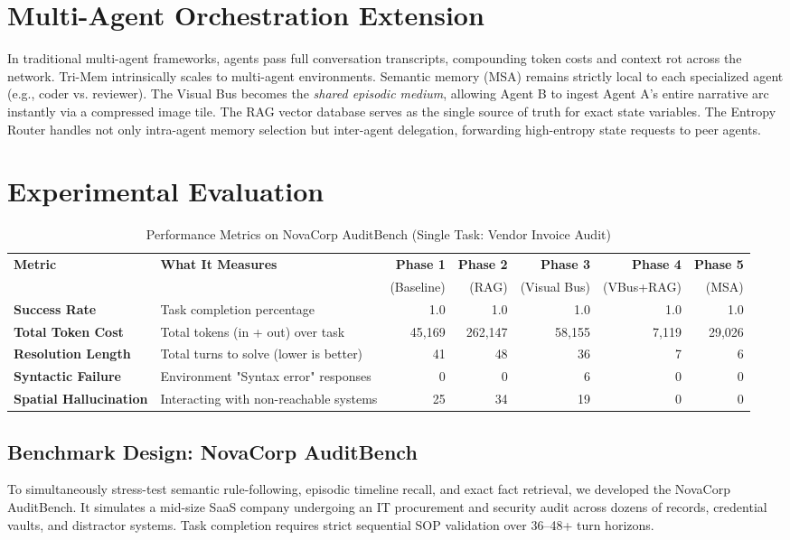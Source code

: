 \documentclass[conference]{IEEEtran}
\begin{document}
\section{Multi-Agent Orchestration Extension}
In traditional multi-agent frameworks, agents pass full conversation transcripts, compounding token costs and context rot across the network. Tri-Mem intrinsically scales to multi-agent environments. Semantic memory (MSA) remains strictly local to each specialized agent (e.g., coder vs. reviewer). The Visual Bus becomes the \textit{shared episodic medium}, allowing Agent B to ingest Agent A's entire narrative arc instantly via a compressed image tile. The RAG vector database serves as the single source of truth for exact state variables. The Entropy Router handles not only intra-agent memory selection but inter-agent delegation, forwarding high-entropy state requests to peer agents.

\section{Experimental Evaluation}

\begin{table}[!t]
\centering
\caption{Performance Metrics on NovaCorp AuditBench (Single Task: Vendor Invoice Audit)}
\label{tab:metrics}
\begin{tabularx}{\textwidth}{@{} l X r r r r r @{}}
\toprule
\textbf{Metric} & \textbf{What It Measures} & \textbf{Phase 1} & \textbf{Phase 2} & \textbf{Phase 3} & \textbf{Phase 4} & \textbf{Phase 5} \\
& & (Baseline) & (RAG) & (Visual Bus) & (VBus+RAG) & (MSA) \\
\midrule
\textbf{Success Rate} & Task completion percentage & 1.0 & 1.0 & 1.0 & 1.0 & 1.0 \\
\textbf{Total Token Cost} & Total tokens (in + out) over task & 45,169 & 262,147 & 58,155 & 7,119 & 29,026 \\
\textbf{Resolution Length} & Total turns to solve (lower is better) & 41 & 48 & 36 & 7 & 6 \\
\textbf{Syntactic Failure} & Environment "Syntax error" responses & 0 & 0 & 6 & 0 & 0 \\
\textbf{Spatial Hallucination} & Interacting with non-reachable systems & 25 & 34 & 19 & 0 & 0 \\
\bottomrule
\end{tabularx}
\end{table}

\subsection{Benchmark Design: NovaCorp AuditBench}
To simultaneously stress-test semantic rule-following, episodic timeline recall, and exact fact retrieval, we developed the NovaCorp AuditBench. It simulates a mid-size SaaS company undergoing an IT procurement and security audit across dozens of records, credential vaults, and distractor systems. Task completion requires strict sequential SOP validation over 36--48+ turn horizons.
\end{document}
